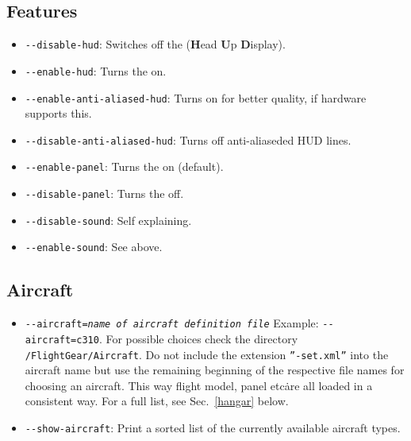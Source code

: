 \subsection{Features}
\begin{itemize}
\item{\texttt{-$ $-disable-hud}}: Switches off the  (\textbf{H}ead \textbf{U}p
  \textbf{D}isplay).
\item{\texttt{-$ $-enable-hud}}: Turns the   on.
\item{\texttt{-$ $-enable-anti-aliased-hud}}: Turns on  for better quality,
if hardware supports this.
\item{\texttt{-$ $-disable-anti-aliased-hud}}: Turns off anti-aliaseded HUD lines.
\item{\texttt{-$ $-enable-panel}}: Turns the  on (default).
\item{\texttt{-$ $-disable-panel}}: Turns the  off.
\item{\texttt{-$ $-disable-sound}}: Self explaining.
\item{\texttt{-$ $-enable-sound}}: See above.
\end{itemize}

\subsection{Aircraft}

\begin{itemize}
\item{\texttt{-$ $-aircraft={\it name of aircraft definition file}}} Example: \texttt{-$ $-aircraft=c310}. For possible choices check the directory \texttt{/FlightGear/Aircraft}. Do not include the extension \texttt{''-set.xml''} into the aircraft name but use the remaining beginning of the respective file names for choosing an aircraft. This way flight model, panel etc\. are all loaded in a consistent way. For a full list, see Sec.~\ref{hangar} below.
\item{\texttt{-$ $-show-aircraft}}: Print a sorted list of the currently available aircraft types. 
\end{itemize}

